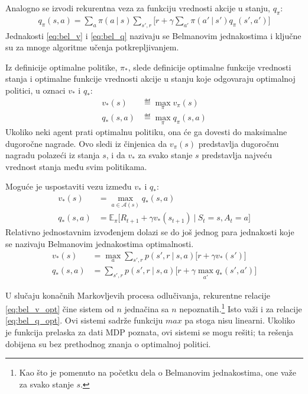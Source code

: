 Analogno se izvodi rekurentna veza za funkciju vrednosti akcije u stanju, $q_{\pi}$:
\begin{equation}
	\label{eq:bel_q}
	\begin{aligned}
		q_{\pi}(s,a) = \sum_{a}^{} \pi(a~|~s)\sum_{s', r}^{}\big[ r+\gamma\sum_{a'}^{}\pi(a'~|~s') q_{\pi}(s', a') \big]
	\end{aligned}
\end{equation}
Jednakosti \eqref{eq:bel_v} i \eqref{eq:bel_q} nazivaju se Belmanovim jednakostima i ključne su za mnoge algoritme učenja potkrepljivanjem. 
\par 
Iz definicije optimalne politike, $\pi_*$, slede definicije optimalne funkcije vrednosti stanja i optimalne funkcije vrednosti akcije u stanju koje odgovaraju optimalnoj politici, u oznaci $v_*$ i $q_*$:
\begin{equation}
	\begin{aligned}
		v_*(s) &\eqdef \max_{\pi} v_{\pi} (s)	 \\
		q_*(s,a) &\eqdef \max_{\pi} q_{\pi}(s,a)
	\end{aligned}
\end{equation}
Ukoliko neki agent prati optimalnu politiku, ona će ga dovesti do maksimalne dugoročne nagrade. Ovo sledi iz činjenica da $v_{\pi}(s)$ predstavlja dugoročnu nagradu polazeći iz stanja $s$, i da $v_*$ za svako stanje $s$ predstavlja najveću vrednost stanja među svim politikama.
\par
Moguće je uspostaviti vezu između $v_*$ i $q_*$:
\begin{equation}
	\begin{aligned}
		v_*(s) &= \max_{a \in \mathcal{A}(s)} q_* (s,a)	 \\
		q_*(s,a) &= \mathbb{E}_{\pi}\big[R_{t+1} + \gamma v_*(s_{t+1})~|~S_t=s, A_t=a\big]
	\end{aligned}
\end{equation}
Relativno jednostavnim izvođenjem dolazi se do još jednog para jednakosti koje se nazivaju Belmanovim jednakostima optimalnosti.
	\begin{align}
		\label{eq:bel_v_opt} v_*(s) &= \max_{a}\sum_{s', r}^{} p(s', r~|~s,a)\big[r+\gamma v_*(s')\big]	 \\
		\label{eq:bel_q_opt} q_*(s,a) &= \sum_{s', r}^{} p(s', r~|~s,a)\big[r + \gamma \max_{a'}q_*(s',a')\big]
	\end{align}
\par 
U slučaju konačnih Markovljevih procesa odlučivanja, rekurentne relacije \eqref{eq:bel_v_opt} čine sistem od $n$ jednačina sa $n$ nepoznatih.\footnote{Kao što je pomenuto na početku dela o Belmanovim jednakostima, one važe za svako stanje $s$.} Isto važi i za relacije \eqref{eq:bel_q_opt}. Ovi sistemi sadrže funkciju $max$ pa stoga nisu linearni. Ukoliko je funkcija prelaska za dati MDP poznata, ovi sistemi se mogu rešiti; ta rešenja dobijena su bez prethodnog znanja o optimalnoj politici. 
